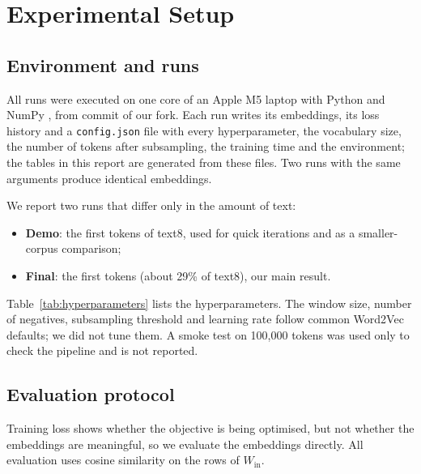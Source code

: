 \section{Experimental Setup}
\label{sec:setup}

\subsection{Environment and runs}

All runs were executed on one core of an Apple M5 laptop with Python \FinalPython{} and NumPy \FinalNumpy{}, from commit \FinalCommit{} of our fork. Each run writes its embeddings, its loss history and a \texttt{config.json} file with every hyperparameter, the vocabulary size, the number of tokens after subsampling, the training time and the environment; the tables in this report are generated from these files. Two runs with the same arguments produce identical embeddings.

We report two runs that differ only in the amount of text:
\begin{itemize}
    \item \textbf{Demo}: the first \DemoTokens{} tokens of text8, used for quick iterations and as a smaller-corpus comparison;
    \item \textbf{Final}: the first \FinalTokens{} tokens (about 29\% of text8), our main result.
\end{itemize}
Table~\ref{tab:hyperparameters} lists the hyperparameters. The window size, number of negatives, subsampling threshold and learning rate follow common Word2Vec defaults; we did not tune them. A smoke test on 100,000 tokens was used only to check the pipeline and is not reported.

\begin{table}[t]
    \centering
    \small
    
    \caption{Hyperparameters shared by both runs (only the number of tokens and the loss report interval differ).}
    \label{tab:hyperparameters}
\end{table}

\subsection{Evaluation protocol}
\label{sec:protocol}

Training loss shows whether the objective is being optimised, but not whether the embeddings are meaningful, so we evaluate the embeddings directly. All evaluation uses cosine similarity on the rows of $W_{\text{in}}$.

